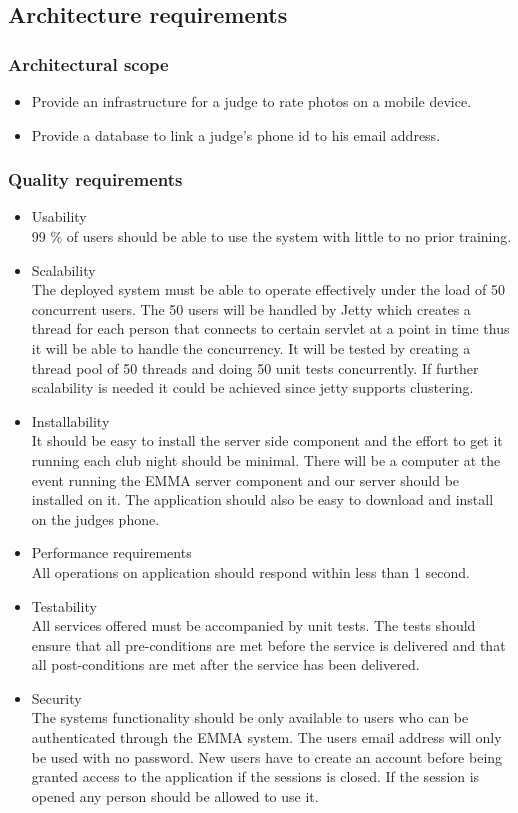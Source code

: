 \documentclass[10pt,a4paper]{article}
\begin{document}
\subsection{Architecture requirements}
\subsubsection{Architectural scope}
\begin{itemize}
\item Provide an infrastructure for a judge to rate photos on a mobile device.
\item Provide a database to link a judge's phone id to his email address.
\end{itemize}
\subsubsection{Quality requirements}
\begin{itemize}
\item Usability \\
99 \% of users should be able to use the system with little to no prior training.
\item Scalability \\
The deployed system must be able to operate effectively under the load of 50 concurrent users. The 50 users will be handled by Jetty which creates a thread for each person that connects to certain servlet at a point in time thus it will be able to handle the concurrency. It will be tested by creating a thread pool of 50 threads and doing 50 unit tests concurrently. If further scalability is needed it could be achieved since jetty supports clustering.
\item Installability \\
It should be easy to install the server side component and the effort to get it running each club night should be minimal. There will be a computer at the event running the EMMA server component and our server should be installed on it. The application should also be easy to download and install on the judges phone.
\item Performance requirements \\
 All operations on application should respond within less than 1 second.
\item Testability \\
All services offered must be accompanied by unit tests. The tests should ensure that all pre-conditions are met before the service is delivered and that all post-conditions are met after the service has been delivered.
\item Security \\
The systems functionality should be only available to users who can be authenticated through the EMMA system. The users email address will only be used with no password. New users have to create an account before being granted access to the application if the sessions is closed. If the session is opened any person should be allowed to use it.
\end{itemize}
\end{document}
